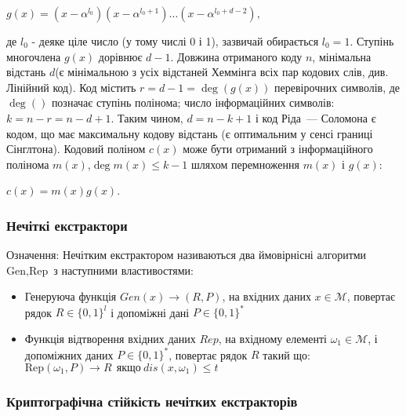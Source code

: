 \documentclass[11pt]{article}
\providecommand{\tightlist}{%
      \setlength{\itemsep}{0pt}\setlength{\parskip}{0pt}}
\begin{document}
\(g(x) = (x - \alpha^{l_0})(x - \alpha^{l_0+1})\dots(x - \alpha^{l_0+d-2}),\)

де \(l_0\) - деяке ціле число (у тому числі 0 і 1), зазвичай обирається
\(l_0 = 1\). Ступінь многочлена $ g (x) $ дорівнює $ d-1 $. Довжина
отриманого коду \(n\), мінімальна відстань \(d\)(є мінімальною з усіх
відстаней Хеммінга всіх пар кодових слів, див. Лінійний код). Код
містить \(r=d-1=\deg (g(x))\) перевірочних символів, де \(\deg()\)
позначає ступінь полінома; число інформаційних символів: $k = n - r = n
- d + 1 $. Таким чином, \(\textstyle d = n - k + 1\) і код Ріда~---
Соломона є кодом, що має максимальну кодову відстань (є оптимальним у
сенсі границі Сінглтона). Кодовий поліном \(c(x)\) може бути отриманий з
інформаційного полінома \(m(x)\),\(\deg m(x) \leqslant k-1\) шляхом
перемноження \(m(x)\) і \(g(x)\):

$ c (x) = m (x) g (x) $.

    \hypertarget{ux43dux435ux447ux456ux442ux43aux456-ux435ux43aux441ux442ux440ux430ux43aux442ux43eux440ux438}{%
\subsubsection{Нечіткі
екстрактори}\label{ux43dux435ux447ux456ux442ux43aux456-ux435ux43aux441ux442ux440ux430ux43aux442ux43eux440ux438}}

Означення: Нечітким екстрактором називаються два ймовірнісні алгоритми
\(\text{Gen}, \text{Rep}\) з наступними властивостями:

\begin{itemize}
\tightlist
\item
  Генеруюча функція \(Gen(x) \rightarrow (R,P)\), на вхідних даних
  \(x \in \mathcal{M}\), повертає рядок \(R \in \{0,1\}^l\) і допоміжні
  дані \(P \in \{0,1\}^*\)
\item
  Функція відтворення вхідних даних \(Rep\), на вхідному елементі
  \(\omega_1 \in \mathcal{M}\), і допоміжних даних \(P \in \{0,1\}^*\),
  повертає рядок \(R\) такий що:\\
  \(\text{Rep}(\omega_1,P) \rightarrow R~~\text{якщо}~  dis(x,\omega_1)\leq t\)
\end{itemize}

    \hypertarget{ux43aux440ux438ux43fux442ux43eux433ux440ux430ux444ux456ux447ux43dux430-ux441ux442ux456ux439ux43aux456ux441ux442ux44c-ux43dux435ux447ux456ux442ux43aux438ux445-ux435ux43aux441ux442ux440ux430ux43aux442ux43eux440ux456ux432}{%
\subsubsection{Криптографічна стійкість нечітких
екстракторів}\label{ux43aux440ux438ux43fux442ux43eux433ux440ux430ux444ux456ux447ux43dux430-ux441ux442ux456ux439ux43aux456ux441ux442ux44c-ux43dux435ux447ux456ux442ux43aux438ux445-ux435ux43aux441ux442ux440ux430ux43aux442ux43eux440ux456ux432}}
\end{document}
